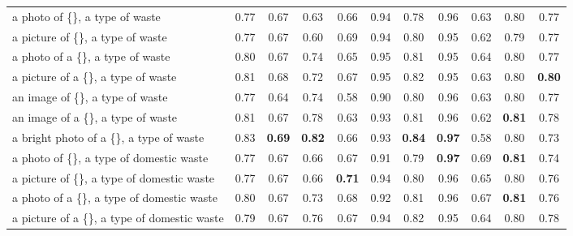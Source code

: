 \documentclass[10pt,a4paper,twocolumn,twoside]{article}
\begin{document}
\begin{table}[h]
\begin{tabular}{lcccccccccc}
  a photo of \{\}, a type of waste                & 0.77          & 0.67          & 0.63          & 0.66          & 0.94          & 0.78          & 0.96          & 0.63          & 0.80          & 0.77          \\
  a   picture of \{\}, a type of waste            & 0.77          & 0.67          & 0.60          & 0.69          & 0.94          & 0.80          & 0.95          & 0.62          & 0.79          & 0.77          \\
  a   photo of a \{\}, a type of waste            & 0.80          & 0.67          & 0.74          & 0.65          & 0.95          & 0.81          & 0.95          & 0.64          & 0.80          & 0.77          \\
  a   picture of a \{\}, a type of waste          & 0.81          & 0.68          & 0.72          & 0.67          & 0.95          & 0.82          & 0.95          & 0.63          & 0.80          & \textbf{0.80} \\
  an   image of \{\}, a type of waste             & 0.77          & 0.64          & 0.74          & 0.58          & 0.90          & 0.80          & 0.96          & 0.63          & 0.80          & 0.77          \\
  an   image of a \{\}, a type of waste           & 0.81          & 0.67          & 0.78          & 0.63          & 0.93          & 0.81          & 0.96          & 0.62          & \textbf{0.81} & 0.78          \\
  a bright photo of a \{\}, a type of waste       & 0.83          & \textbf{0.69} & \textbf{0.82} & 0.66          & 0.93          & \textbf{0.84} & \textbf{0.97} & 0.58          & 0.80          & 0.73          \\
  a photo of \{\}, a type of domestic waste       & 0.77          & 0.67          & 0.66          & 0.67          & 0.91          & 0.79          & \textbf{0.97} & 0.69          & \textbf{0.81} & 0.74          \\
  a   picture of \{\}, a type of domestic waste   & 0.77          & 0.67          & 0.66          & \textbf{0.71} & 0.94          & 0.80          & 0.96          & 0.65          & 0.80          & 0.76          \\
  a   photo of a \{\}, a type of domestic waste   & 0.80          & 0.67          & 0.73          & 0.68          & 0.92          & 0.81          & 0.96          & 0.67          & \textbf{0.81} & 0.76          \\
  a   picture of a \{\}, a type of domestic waste & 0.79          & 0.67          & 0.76          & 0.67          & 0.94          & 0.82          & 0.95          & 0.64          & 0.80          & 0.78          \\

\end{tabular}
\end{table}
\end{document}

